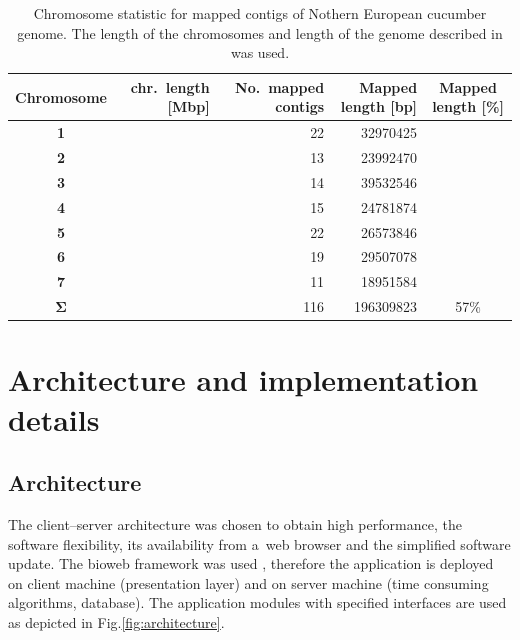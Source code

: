 \documentclass[a4paper]{spie}
\begin{document}
\begin{table}
	\centering
	\begin{tabular}{|c||r|r|r|c|} \hline
	  \textbf{Chromosome}    & chr.\ length [Mbp] & No.\ mapped contigs & Mapped length [bp] & Mapped length [\%] \\
      \hline
      \textbf{1}             &                    &  22                 &  32970425          &                    \\
      \textbf{2}             &                    &  13                 &  23992470          &                    \\
      \textbf{3}             &                    &  14                 &  39532546          &                    \\
      \textbf{4}             &                    &  15                 &  24781874          &                    \\
      \textbf{5}             &                    &  22                 &  26573846          &                    \\
      \textbf{6}             &                    &  19                 &  29507078          &                    \\
      \textbf{7}             &                    &  11                 &  18951584          &                    \\
      \hline
      $\mathbf{\Sigma}$      &                    & 116                 & 196309823          &  57\%              \\
      \hline
	\end{tabular}
	\caption{Chromosome statistic for mapped contigs of Nothern European cucumber genome.
      The length of the chromosomes and length of the genome described in \cite{} was used.}
	\label{tab:genome_stat}
\end{table}

\section{Architecture and implementation details}

\subsection{Architecture}

The client--server architecture was chosen to obtain high performance, the software flexibility,
its availability from a~web browser and the simplified software update.
The bioweb framework was used \cite{rn:bmri2014biosoftarch},
therefore the application is deployed on client machine (presentation layer) and on server machine (time consuming algorithms, database).
The application modules with specified interfaces are used as depicted in Fig.\ref{fig:architecture}.
\end{document}
